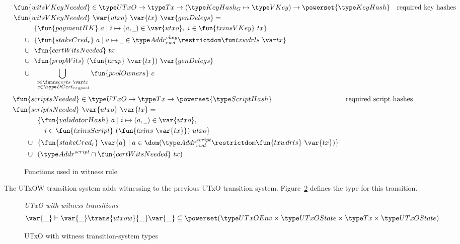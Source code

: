 \begin{figure}[htb]
  \begin{align*}
    & \hspace{-0.8cm}\fun{witsVKeyNeeded} \in \UTxO \to \Tx \to (\KeyHashGen\mapsto\VKey) \to
      \powerset{\KeyHash}
    & \text{required key hashes} \\
    &  \hspace{-0.8cm}\fun{witsVKeyNeeded}~\var{utxo}~\var{tx}~\var{genDelegs} = \\
    & ~~\{ \fun{paymentHK}~a \mid i \mapsto (a, \wcard) \in \var{utxo},~i\in\fun{txinsVKey}~{tx} \} \\
    \cup & ~~
           \{\fun{stakeCred_r}~a\mid a\mapsto \wcard \in \AddrRWDVKey
      \restrictdom \txwdrls{tx}\}\\
    \cup & ~~\fun{certWitsNeeded}~{tx} \\
    \cup & ~~\fun{propWits}~(\fun{txup}~\var{tx})~\var{genDelegs} \\
    \cup & ~~\bigcup_{\substack{c \in \txcerts{tx} \\ ~c \in\DCertRegPool}} \fun{poolOwners}~{c}
  \end{align*}
  \begin{align*}
    & \hspace{-1cm}\fun{scriptsNeeded} \in \UTxO \to \Tx \to
      \powerset{\HashScr}
    & \text{required script hashes} \\
    &  \hspace{-1cm}\fun{scriptsNeeded}~\var{utxo}~\var{tx} = \\
    & ~~\{ \fun{validatorHash}~a \mid i \mapsto (a, \wcard) \in \var{utxo},\\
    & ~~~~~i\in\fun{txinsScript}~{(\fun{txins~\var{tx}})}~{utxo}\} \\
    \cup & ~~\{ \fun{stakeCred_{r}}~\var{a} \mid a \in \dom (\AddrRWDScr
           \restrictdom \fun{txwdrls}~\var{tx}) \} \\
      \cup & ~~(\AddrScr \cap \fun{certWitsNeeded}~{tx})
  \end{align*}
  \caption{Functions used in witness rule}
  \label{fig:functions-witnesses}
\end{figure}

The UTxOW transition system adds witnessing to the previous UTxO transition system.
Figure~\ref{fig:ts-types:utxow-shelley} defines the type for this transition.

\begin{figure}
  \emph{UTxO with witness transitions}
  \begin{equation*}
    \var{\_} \vdash
    \var{\_} \trans{utxow}{\_} \var{\_}
    \subseteq \powerset (\UTxOEnv \times \UTxOState \times \Tx \times \UTxOState)
  \end{equation*}
  \caption{UTxO with witness transition-system types}
  \label{fig:ts-types:utxow-shelley}
\end{figure}

